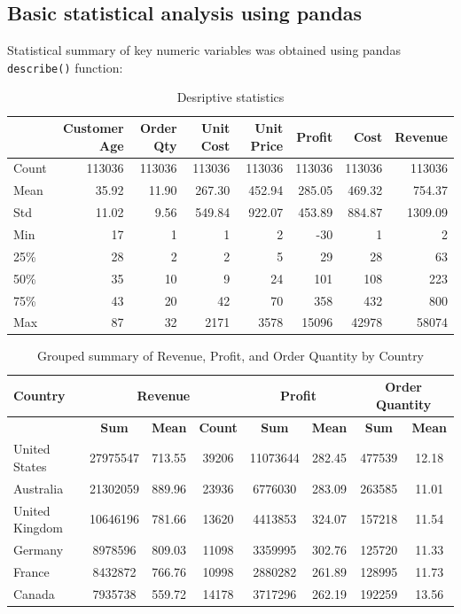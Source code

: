 \documentclass[11pt]{article}
\begin{document}
\subsection{Basic statistical analysis using pandas}
Statistical summary of key numeric variables was obtained using pandas \texttt{describe()} function:
\begin{table}[h!]
\caption{Desriptive statistics}
\centering
\scriptsize
\setlength{\tabcolsep}{4pt}
\renewcommand{\arraystretch}{0.9}
\begin{tabular}{|l|r|r|r|r|r|r|r|}
\hline
 & \textbf{Customer Age} & \textbf{Order Qty} & \textbf{Unit Cost} & \textbf{Unit Price} & \textbf{Profit} & \textbf{Cost} & \textbf{Revenue} \\
\hline
Count & 113036 & 113036 & 113036 & 113036 & 113036 & 113036 & 113036 \\
Mean  & 35.92  & 11.90  & 267.30 & 452.94 & 285.05 & 469.32 & 754.37 \\
Std   & 11.02  & 9.56   & 549.84 & 922.07 & 453.89 & 884.87 & 1309.09 \\
Min   & 17     & 1      & 1      & 2      & -30    & 1      & 2 \\
25\%  & 28     & 2      & 2      & 5      & 29     & 28     & 63 \\
50\%  & 35     & 10     & 9      & 24     & 101    & 108    & 223 \\
75\%  & 43     & 20     & 42     & 70     & 358    & 432    & 800 \\
Max   & 87     & 32     & 2171   & 3578   & 15096  & 42978  & 58074 \\
\hline
\end{tabular}
\end{table}

\begin{table}[ht]
\caption{Grouped summary of Revenue, Profit, and Order Quantity by Country}
\centering
\scriptsize
\setlength{\tabcolsep}{4pt}
\renewcommand{\arraystretch}{0.9}
\begin{tabular}{|l|ccc|cc|cc|}
\hline
\textbf{Country} &
\multicolumn{3}{c|}{\textbf{Revenue}} &
\multicolumn{2}{c|}{\textbf{Profit}} &
\multicolumn{2}{c|}{\textbf{Order Quantity}} \\
\hline
 &
\textbf{Sum} & \textbf{Mean} & \textbf{Count} &
\textbf{Sum} & \textbf{Mean} &
\textbf{Sum} & \textbf{Mean} \\
\hline
United States  & 27975547 & 713.55 & 39206 & 11073644 & 282.45 & 477539 & 12.18 \\
Australia      & 21302059 & 889.96 & 23936 & 6776030  & 283.09 & 263585 & 11.01 \\
United Kingdom & 10646196 & 781.66 & 13620 & 4413853  & 324.07 & 157218 & 11.54 \\
Germany        & 8978596  & 809.03 & 11098 & 3359995  & 302.76 & 125720 & 11.33 \\
France         & 8432872  & 766.76 & 10998 & 2880282  & 261.89 & 128995 & 11.73 \\
Canada         & 7935738  & 559.72 & 14178 & 3717296  & 262.19 & 192259 & 13.56 \\
\hline
\end{tabular}
\end{table}
\end{document}
